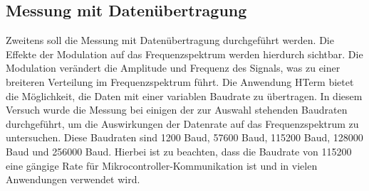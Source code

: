     \subsection{Messung mit Datenübertragung}
    Zweitens soll die Messung mit Datenübertragung durchgeführt werden. Die Effekte der Modulation auf das Frequenzspektrum werden hierdurch sichtbar. Die Modulation verändert die Amplitude und Frequenz des Signals, was zu einer breiteren Verteilung im Frequenzspektrum führt.
    Die Anwendung HTerm bietet die Möglichkeit, die Daten mit einer variablen Baudrate zu übertragen. In diesem Versuch wurde die Messung bei einigen der zur Auswahl stehenden Baudraten durchgeführt, um die Auswirkungen der Datenrate auf das Frequenzspektrum zu untersuchen. Diese Baudraten sind 1200 Baud, 57600 Baud, 115200 Baud, 128000 Baud und 256000 Baud.
    Hierbei ist zu beachten, dass die Baudrate von 115200 eine gängige Rate für Mikrocontroller-Kommunikation ist und in vielen Anwendungen verwendet wird.


